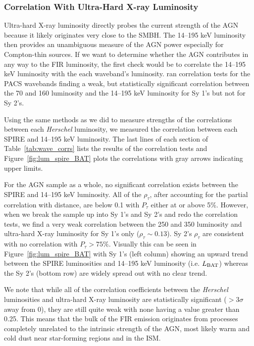 \subsubsection{Correlation With Ultra-Hard X-ray Luminosity}
Ultra-hard X-ray luminosity directly probes the current strength of the AGN because it likely originates very close to the SMBH. The 14--195 keV luminosity then provides an unambiguous measure of the AGN power especially for Compton-thin sources. If we want to determine whether the AGN contributes in any way to the FIR luminosity, the first check would be to correlate the 14--195 keV luminosity with the each waveband's luminosity. \citet{Melendez:2014yu} ran correlation tests for the PACS wavebands finding a weak, but statistically significant correlation between the 70 and 160 \um{} luminosity and the 14--195 keV luminosity for Sy 1's but not for Sy 2's.

Using the same methods as we did to measure strengths of the correlations between each \textit{Herschel} luminosity, we measured the correlation between each SPIRE and 14--195 keV luminosity. The last lines of each section of Table~\ref{tab:wave_corrs} lists the results of the correlation tests and Figure~\ref{fig:lum_spire_BAT} plots the correlations with gray arrows indicating upper limits.

For the AGN sample as a whole, no significant correlation exists between the SPIRE and 14--195 keV luminosity. All of the $\rho_{\tau}$, after accounting for the partial correlation with distance, are below 0.1 with $P_{\tau}$ either at or above 5\%. However, when we break the sample up into Sy 1's and Sy 2's and redo the correlation tests, we find a very weak correlation between the 250 and 350 \um{} luminosity and ultra-hard X-ray luminosity for Sy 1's only ($\rho_{\tau}\sim0.13$). Sy 2's $\rho_{\tau}$ are consistent with no correlation with $P_{\tau}>75\%$. Visually this can be seen in Figure~\ref{fig:lum_spire_BAT} with Sy 1's (left column) showing an upward trend between the SPIRE luminosities and 14--195 keV luminosity (i.e. $L_{\rm BAT}$) whereas the Sy 2's (bottom row) are widely spread out with no clear trend.

We note that while all of the correlation coefficients between the \textit{Herschel} luminosities and ultra-hard X-ray luminosity are statistically significant ($>3\sigma$ away from 0), they are still quite weak with none having a value greater than 0.25. This means that the bulk of the FIR emission originates from processes completely unrelated to the intrinsic strength of the AGN, most likely warm and cold dust near star-forming regions and in the ISM.
  